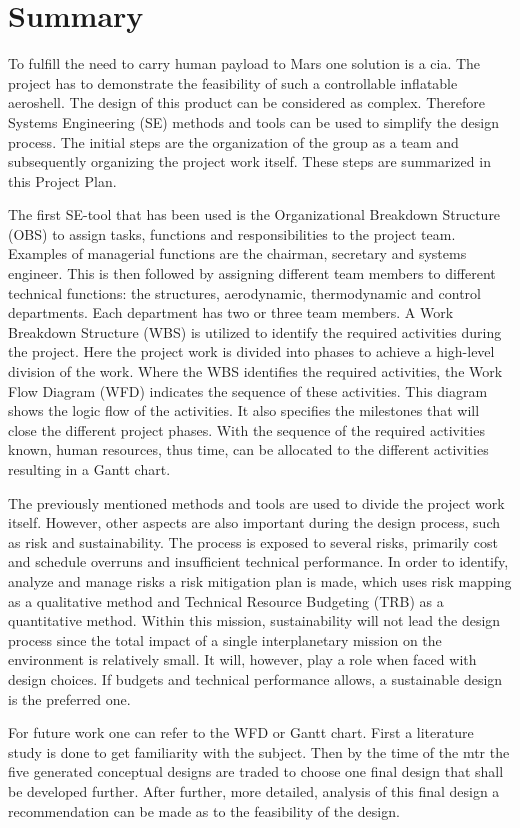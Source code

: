 \section*{Summary}\label{cha:summary}
To fulfill the need to carry human payload to Mars one solution is a \gls{cia}. The project has to demonstrate the feasibility of such a controllable inflatable aeroshell. The design of this product can be considered as complex. Therefore Systems Engineering (SE) methods and tools can be used to simplify the design process. The initial steps are the organization of the group as a team and subsequently organizing the project work itself. These steps are summarized in this Project Plan.

The first SE-tool that has been used is the Organizational Breakdown Structure (OBS) to assign tasks, functions and responsibilities to the project team. Examples of managerial functions are the chairman, secretary and systems engineer. This is then followed by assigning different team members to different technical functions: the structures, aerodynamic, thermodynamic and control departments. Each department has two or three team members. A Work Breakdown Structure (WBS) is utilized to identify the required activities during the project. Here the project work is divided into phases to achieve a high-level division of the work. Where the WBS identifies the required activities, the Work Flow Diagram (WFD) indicates the sequence of these activities. This diagram shows the logic flow of the activities. It also specifies the milestones that will close the different project phases. With the sequence of the required activities known, human resources, thus time, can be allocated to the different activities resulting in a Gantt chart. 

The previously mentioned methods and tools are used to divide the project work itself. However, other aspects are also important during the design process, such as risk and sustainability. The process is exposed to several risks, primarily cost and schedule overruns and insufficient technical performance. In order to identify, analyze and manage risks a risk mitigation plan is made, which uses risk mapping as a qualitative method and Technical Resource Budgeting (TRB) as a quantitative method. Within this mission, sustainability will not lead the design process since the total impact of a single interplanetary mission on the environment is relatively small. It will, however, play a role when faced with design choices. If budgets and technical performance allows, a sustainable design is the preferred one.

For future work one can refer to the WFD or Gantt chart. First a literature study is done to get familiarity with the subject. Then by the time of the \gls{mtr} the five generated conceptual designs are traded to choose one final design that shall be developed further. After further, more detailed, analysis of this final design a recommendation can be made as to the feasibility of the design.

